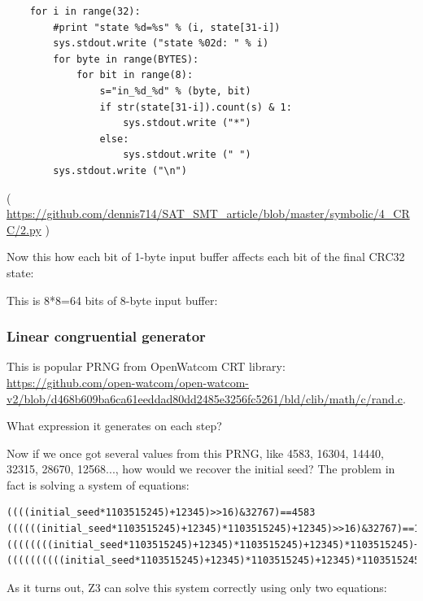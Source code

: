 \begin{lstlisting}
    for i in range(32):
        #print "state %d=%s" % (i, state[31-i])
        sys.stdout.write ("state %02d: " % i)
        for byte in range(BYTES):
            for bit in range(8):
                s="in_%d_%d" % (byte, bit)
                if str(state[31-i]).count(s) & 1:
                    sys.stdout.write ("*")
                else:
                    sys.stdout.write (" ")
        sys.stdout.write ("\n")
\end{lstlisting}

( \url{https://github.com/dennis714/SAT_SMT_article/blob/master/symbolic/4_CRC/2.py} )

Now this how each bit of 1-byte input buffer affects each bit of the final CRC32 state:



This is 8*8=64 bits of 8-byte input buffer:



\subsubsection{Linear congruential generator}

This is popular \ac{PRNG} from OpenWatcom \ac{CRT} library: \url{https://github.com/open-watcom/open-watcom-v2/blob/d468b609ba6ca61eeddad80dd2485e3256fc5261/bld/clib/math/c/rand.c}.

What expression it generates on each step?





Now if we once got several values from this PRNG, like 4583, 16304, 14440, 32315, 28670, 12568..., how would we
recover the initial seed?
The problem in fact is solving a system of equations:

\begin{lstlisting}
((((initial_seed*1103515245)+12345)>>16)&32767)==4583
((((((initial_seed*1103515245)+12345)*1103515245)+12345)>>16)&32767)==16304
((((((((initial_seed*1103515245)+12345)*1103515245)+12345)*1103515245)+12345)>>16)&32767)==14440
((((((((((initial_seed*1103515245)+12345)*1103515245)+12345)*1103515245)+12345)*1103515245)+12345)>>16)&32767)==32315
\end{lstlisting}

As it turns out, Z3 can solve this system correctly using only two equations:


